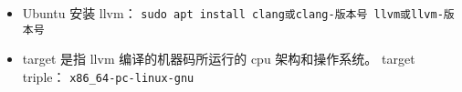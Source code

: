 
\begin{issues}
\issueDraft
\end{issues}


\begin{itemize}
\item Ubuntu 安装 llvm： \verb|sudo apt install clang或clang-版本号 llvm或llvm-版本号|
\item target 是指 llvm 编译的机器码所运行的 cpu 架构和操作系统。 target triple： \verb|x86_64-pc-linux-gnu|
\end{itemize}
